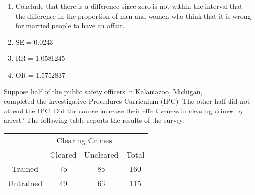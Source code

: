 \documentclass[11pt]{book}\usepackage[]{graphicx}\usepackage[]{color}
\begin{document}
\begin{exercises}
\begin{exercise}
\begin{enumerate}

\end{enumerate}

	\end{exercise}
	\begin{solution}



	  \begin{enumerate}
	  \item Conclude that there is a difference since zero is not within the interval that the difference in the proportion of men and women who think that it is wrong for married people to have an affair.
	  \item SE = 0.0243
	  \item RR = 1.0581245
	  \item OR = 1.5752837
	  \end{enumerate}

	\end{solution}

  \begin{exercise} %

      Suppose half of the public safety officers in Kalamazoo, Michigan, \\ completed the Investigative Procedures Curriculum (IPC).  The other half did not attend the IPC.  Did the course increase their effectiveness in clearing crimes by arrest?  The following table reports the results of the survey:

\vspace{2mm}


\begin{table}[ht]
\centering
\begin{tabular}{@{} cccc @{}} \hline
 & \multicolumn{2}{c}{Clearing Crimes} \\
 & Cleared & Uncleared & Total \\ \hline
Trained & 75 & 85 & 160 \\
Untrained & 49 & 66 & 115 \\ \hline
\end{tabular}
\end{table}



\end{exercise}
\end{exercises}
\end{document}
